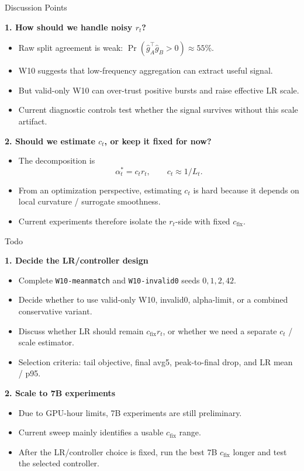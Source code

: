 \documentclass[aspectratio=169]{beamer}
\begin{document}
\begin{frame}{Discussion Points}
\small

\textbf{1. How should we handle noisy \(r_t\)?}

\begin{itemize}
  \item Raw split agreement is weak: \(\Pr(\hat g_A^\top \hat g_B>0)\approx55\%\).
  \item W10 suggests that low-frequency aggregation can extract useful signal.
  \item But valid-only W10 can over-trust positive bursts and raise effective LR scale.
  \item Current diagnostic controls test whether the signal survives without this scale artifact.
\end{itemize}


\textbf{2. Should we estimate \(c_t\), or keep it fixed for now?}

\begin{itemize}
  \item The decomposition is
  \[
    \alpha_t^*=c_t r_t,
    \qquad
    c_t \approx 1/L_t .
  \]
  \item From an optimization perspective, estimating \(c_t\) is hard because it depends on local curvature / surrogate smoothness.
  \item Current experiments therefore isolate the \(r_t\)-side with fixed \(c_{\mathrm{fix}}\).
\end{itemize}

\end{frame}


\begin{frame}{Todo}
\small

\textbf{1. Decide the LR/controller design}

\begin{itemize}
  \item Complete \texttt{W10-meanmatch} and \texttt{W10-invalid0} seeds \(0,1,2,42\).
  \item Decide whether to use valid-only W10, invalid0, alpha-limit, or a combined conservative variant.
  \item Discuss whether LR should remain \(c_{\mathrm{fix}}r_t\), or whether we need a separate \(c_t\) / scale estimator.
  \item Selection criteria: tail objective, final avg5, peak-to-final drop, and LR mean / p95.
\end{itemize}


\textbf{2. Scale to 7B experiments}

\begin{itemize}
  \item Due to GPU-hour limits, 7B experiments are still preliminary.
  \item Current sweep mainly identifies a usable \(c_{\mathrm{fix}}\) range.
  \item After the LR/controller choice is fixed, run the best 7B \(c_{\mathrm{fix}}\) longer and test the selected controller.
\end{itemize}

\end{frame}
\end{document}
